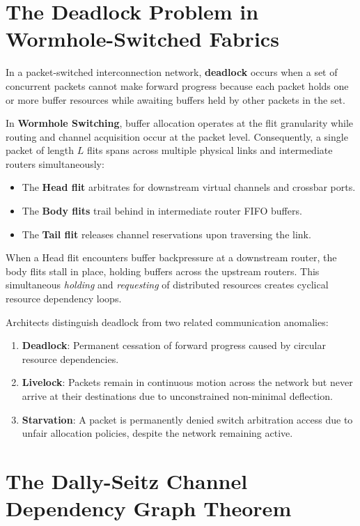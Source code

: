 \section{The Deadlock Problem in Wormhole-Switched Fabrics}
\label{sec:ch5_problem}

In a packet-switched interconnection network, \textbf{deadlock} occurs when a set of concurrent packets cannot make forward progress because each packet holds one or more buffer resources while awaiting buffers held by other packets in the set.

In \textbf{Wormhole Switching}, buffer allocation operates at the flit granularity while routing and channel acquisition occur at the packet level. Consequently, a single packet of length $L$ flits spans across multiple physical links and intermediate routers simultaneously:
\begin{itemize}
    \item The \textbf{Head flit} arbitrates for downstream virtual channels and crossbar ports.
    \item The \textbf{Body flits} trail behind in intermediate router FIFO buffers.
    \item The \textbf{Tail flit} releases channel reservations upon traversing the link.
\end{itemize}
When a Head flit encounters buffer backpressure at a downstream router, the body flits stall in place, holding buffers across the upstream routers. This simultaneous \emph{holding} and \emph{requesting} of distributed resources creates cyclical resource dependency loops.

Architects distinguish deadlock from two related communication anomalies:
\begin{enumerate}
    \item \textbf{Deadlock}: Permanent cessation of forward progress caused by circular resource dependencies.
    \item \textbf{Livelock}: Packets remain in continuous motion across the network but never arrive at their destinations due to unconstrained non-minimal deflection.
    \item \textbf{Starvation}: A packet is permanently denied switch arbitration access due to unfair allocation policies, despite the network remaining active.
\end{enumerate}

\section{The Dally-Seitz Channel Dependency Graph Theorem}
\label{sec:ch5_dally_seitz}

